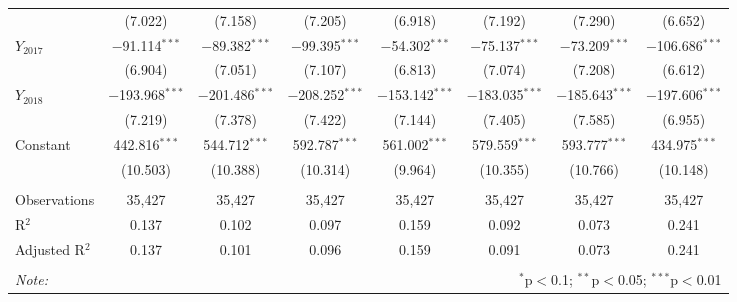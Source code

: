 \documentclass[12pt,a4paper]{article}
\begin{document}
\begin{table}[!ht]
{\begin{tabular}{lccccccc}
				& (7.022) & (7.158) & (7.205) & (6.918) & (7.192) & (7.290) & (6.652) \\ 
				$Y_{2017}$ & $-$91.114$^{***}$ & $-$89.382$^{***}$ & $-$99.395$^{***}$ & $-$54.302$^{***}$ & $-$75.137$^{***}$ & $-$73.209$^{***}$ & $-$106.686$^{***}$ \\ 
				& (6.904) & (7.051) & (7.107) & (6.813) & (7.074) & (7.208) & (6.612) \\ 
				$Y_{2018}$ & $-$193.968$^{***}$ & $-$201.486$^{***}$ & $-$208.252$^{***}$ & $-$153.142$^{***}$ & $-$183.035$^{***}$ & $-$185.643$^{***}$ & $-$197.606$^{***}$ \\ 
				& (7.219) & (7.378) & (7.422) & (7.144) & (7.405) & (7.585) & (6.955) \\ 
				Constant & 442.816$^{***}$ & 544.712$^{***}$ & 592.787$^{***}$ & 561.002$^{***}$ & 579.559$^{***}$ & 593.777$^{***}$ & 434.975$^{***}$ \\ 
				& (10.503) & (10.388) & (10.314) & (9.964) & (10.355) & (10.766) & (10.148) \\ 
				\hline \\[-1.8ex] 
				Observations & 35,427 & 35,427 & 35,427 & 35,427 & 35,427 & 35,427 & 35,427 \\ 
				R$^{2}$ & 0.137 & 0.102 & 0.097 & 0.159 & 0.092 & 0.073 & 0.241 \\ 
				Adjusted R$^{2}$ & 0.137 & 0.101 & 0.096 & 0.159 & 0.091 & 0.073 & 0.241 \\ 
				\hline 
				\hline \\[-1.8ex] 
				\textit{Note:}  & \multicolumn{7}{r}{$^{*}$p$<$0.1; $^{**}$p$<$0.05; $^{***}$p$<$0.01} \\ 
		\end{tabular} }
	\end{table} 
	
	
\end{document}
